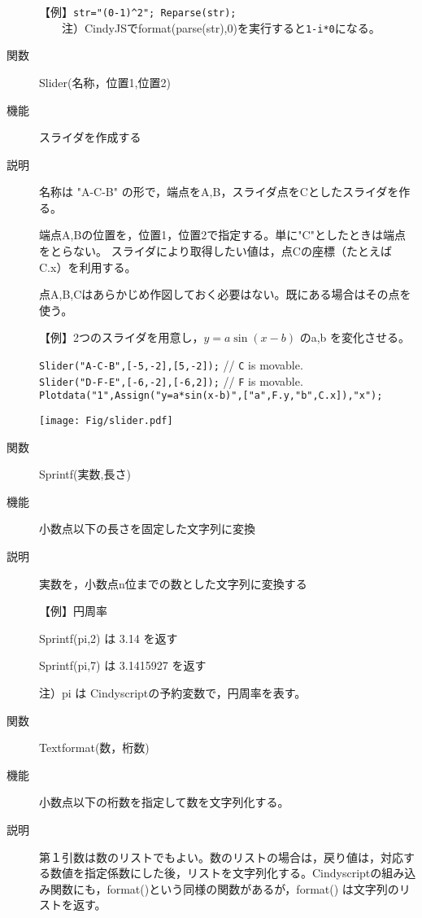 \documentclass[papersize,a4paper,10pt,uplatex]{jsarticle}
\begin{document}
\begin{description}
【例】\verb|str="(0-1)^2"; Reparse(str);|\\
　　注）CindyJSでformat(parse(str),0)を実行すると\verb|1-i*0|になる。

\vspace{\baselineskip}
\hypertarget{slider}{}
\item[関数]Slider(名称，位置1,位置2)
\item[機能]スライダを作成する
\item[説明]名称は "A-C-B" の形で，端点をA,B，スライダ点をCとしたスライダを作る。

端点A,Bの位置を，位置1，位置2で指定する。単に"C"としたときは端点をとらない。
スライダにより取得したい値は，点Cの座標（たとえば C.x）を利用する。

点A,B,Cはあらかじめ作図しておく必要はない。既にある場合はその点を使う。

\vspace{\baselineskip}
【例】2つのスライダを用意し，$y=a\sin(x-b)$ のa,b を変化させる。

\verb|Slider("A-C-B",[-5,-2],[5,-2]);| // \verb|C| is movable.\\
\verb|Slider("D-F-E",[-6,-2],[-6,2]);| // \verb|F| is movable.\\
\verb|Plotdata("1",Assign("y=a*sin(x-b)",["a",F.y,"b",C.x]),"x"); |

\vspace{2mm}
\hspace{15mm}
\texttt{[image: Fig/slider.pdf]} 

\vspace{\baselineskip}
\hypertarget{sprintf}{}
\item[関数]Sprintf(実数,長さ)
\item[機能]小数点以下の長さを固定した文字列に変換
\item[説明]実数を，小数点n位までの数とした文字列に変換する

\vspace{\baselineskip}
【例】円周率

 Sprintf(pi,2) は 3.14 を返す

 Sprintf(pi,7) は 3.1415927 を返す

注）pi は Cindyscriptの予約変数で，円周率を表す。%

\vspace{\baselineskip}
\hypertarget{textformat}{}
\item[関数]Textformat(数，桁数)
\item[機能]小数点以下の桁数を指定して数を文字列化する。
\item[説明]第１引数は数のリストでもよい。数のリストの場合は，戻り値は，対応する数値を指定係数にした後，リストを文字列化する。Cindyscriptの組み込み関数にも，format()という同様の関数があるが，format() は文字列のリストを返す。


\end{description}
\end{document}
